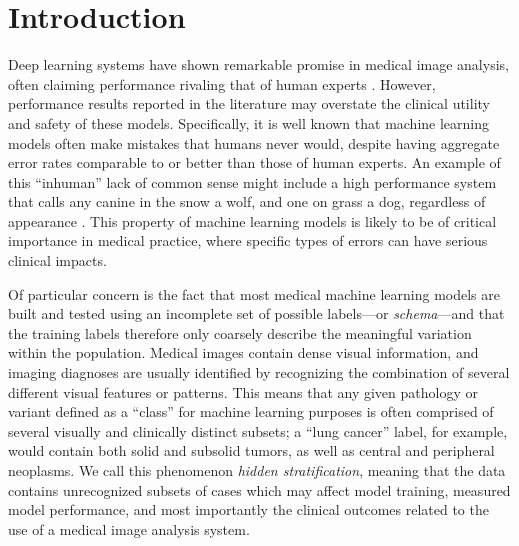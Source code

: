 \documentclass[sigconf,anonymous,review]{acmart}
\begin{document}

\maketitle

\section{Introduction}
Deep learning systems have shown remarkable promise in medical image analysis, often claiming performance rivaling that of human experts \citep{esteva2019guide}. 
 However, performance results reported in the literature may overstate the clinical utility and safety of these models.  
 Specifically, it is well known that machine learning models often make mistakes that humans never would, despite having aggregate error rates comparable to or better than those of human experts. An example of this ``inhuman'' lack of common sense might include a high performance system that calls any canine in the snow a wolf, and one on grass a dog, regardless of appearance \citep{ribeiro2016should}.
This property of machine learning models is likely to be of critical importance in medical practice, where specific types of errors can have serious clinical impacts. 
 
Of particular concern is the fact that most medical machine learning models are built and tested using an incomplete set of possible labels---or \textit{schema}---and that the training labels therefore only coarsely describe the meaningful variation within the population. 
Medical images contain dense visual information, and imaging diagnoses are usually identified by recognizing the combination of several different visual features or patterns. 
This means that any given pathology or variant defined as a ``class'' for machine learning purposes is often comprised of several visually and clinically distinct subsets; a ``lung cancer'' label, for example, would contain both solid and subsolid tumors, as well as central and peripheral neoplasms. 
We call this phenomenon \textit{hidden stratification}, meaning that the data contains unrecognized subsets of cases which may affect model training, measured model performance, and most importantly the clinical outcomes related to the use of a medical image analysis system.  
\end{document}
